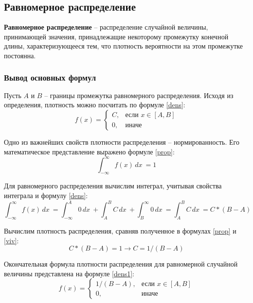\newpage

\subsection*{Равномерное распределение}
\textbf{Равномерное распределение} -- распределение случайной величины, принимающей значения, принадлежащие некоторому промежутку конечной длины, характеризующееся тем, что плотность вероятности на этом промежутке постоянна.


\subsubsection*{Вывод основных формул}
Пусть $A$ и $B$ -- границы промежутка равномерного распределения. Исходя из определения, плотность можно посчитать по формуле \ref{dens}:
\begin{equation}
	\label{dens}
	f(x)= 
	\begin{cases}
		C,& \text{если } x \in [A, B]\\
		0,              & \text{иначе}
	\end{cases}
\end{equation}

Одно из важнейших свойств плотности распределения -- нормированность. Его математическое представление выражено формуле \ref{prop}:
\begin{equation}
	\label{prop}
	\int_{-\infty}^{\infty} f(x) \,dx \ = 1
\end{equation}

Для равномерного распределения вычислим интеграл, учитывая свойства интеграла и формулу \ref{dens}:
\begin{equation}
	\label{viv}
	\int_{-\infty}^{\infty} f(x) \,dx \ = \int_{-\infty}^{A} 0 \,dx \ + \int_{A}^{B} C \,dx \ + \int_{B}^{\infty} 0 \,dx \ = \int_{A}^{B} C \,dx \ = C*(B - A)
\end{equation}

Вычислим плотность распределения, сравняв полученное в формулах \ref{prop} и \ref{viv}:
\begin{equation}
	\label{vivProb}
	C*(B - A) = 1 \rightarrow C = 1 / (B - A)
\end{equation}

Окончательная формула плотности распределения для равномерной случайной величины представлена на формуле \ref{dens1}:
\begin{equation}
	\label{dens1}
	f(x)= 
	\begin{cases}
		1 / (B - A),& \text{если } x \in [A, B]\\
		0,              & \text{иначе}
	\end{cases}
\end{equation}

